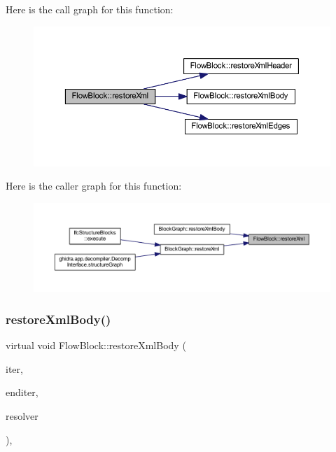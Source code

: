 Here is the call graph for this function\+:
\nopagebreak
\begin{figure}[H]
\begin{center}
\leavevmode
\includegraphics[width=350pt]{class_flow_block_a002ddc14dc84098dcb14b513f8b973c1_cgraph}
\end{center}
\end{figure}
Here is the caller graph for this function\+:
\nopagebreak
\begin{figure}[H]
\begin{center}
\leavevmode
\includegraphics[width=350pt]{class_flow_block_a002ddc14dc84098dcb14b513f8b973c1_icgraph}
\end{center}
\end{figure}
\mbox{\label{class_flow_block_aea33ed5d172e8486557198c2e18c88ae}} 
\subsubsection{\texorpdfstring{restoreXmlBody()}{restoreXmlBody()}}
{\footnotesize\ttfamily virtual void Flow\+Block\+::restore\+Xml\+Body (\begin{DoxyParamCaption}\item[{List\+::const\+\_\+iterator \&}]{iter,  }\item[{List\+::const\+\_\+iterator}]{enditer,  }\item[{\mbox{\hyperlink{class_block_map}{Block\+Map}} \&}]{resolver }\end{DoxyParamCaption})\hspace{0.3cm}{\ttfamily [inline]}, {\ttfamily [virtual]}}



